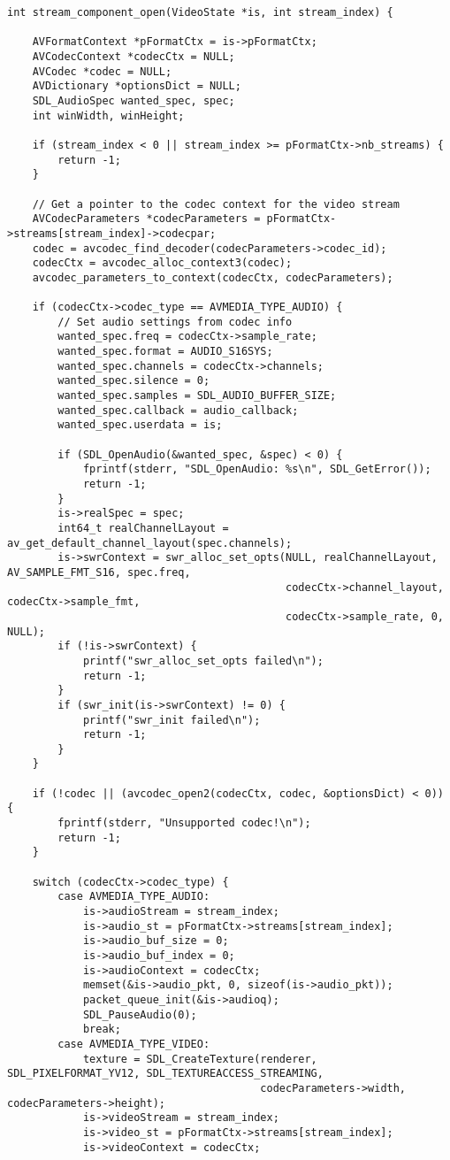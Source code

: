 \begin{lstlisting}
int stream_component_open(VideoState *is, int stream_index) {

    AVFormatContext *pFormatCtx = is->pFormatCtx;
    AVCodecContext *codecCtx = NULL;
    AVCodec *codec = NULL;
    AVDictionary *optionsDict = NULL;
    SDL_AudioSpec wanted_spec, spec;
    int winWidth, winHeight;

    if (stream_index < 0 || stream_index >= pFormatCtx->nb_streams) {
        return -1;
    }

    // Get a pointer to the codec context for the video stream
    AVCodecParameters *codecParameters = pFormatCtx->streams[stream_index]->codecpar;
    codec = avcodec_find_decoder(codecParameters->codec_id);
    codecCtx = avcodec_alloc_context3(codec);
    avcodec_parameters_to_context(codecCtx, codecParameters);

    if (codecCtx->codec_type == AVMEDIA_TYPE_AUDIO) {
        // Set audio settings from codec info
        wanted_spec.freq = codecCtx->sample_rate;
        wanted_spec.format = AUDIO_S16SYS;
        wanted_spec.channels = codecCtx->channels;
        wanted_spec.silence = 0;
        wanted_spec.samples = SDL_AUDIO_BUFFER_SIZE;
        wanted_spec.callback = audio_callback;
        wanted_spec.userdata = is;

        if (SDL_OpenAudio(&wanted_spec, &spec) < 0) {
            fprintf(stderr, "SDL_OpenAudio: %s\n", SDL_GetError());
            return -1;
        }
        is->realSpec = spec;
        int64_t realChannelLayout = av_get_default_channel_layout(spec.channels);
        is->swrContext = swr_alloc_set_opts(NULL, realChannelLayout, AV_SAMPLE_FMT_S16, spec.freq,
                                            codecCtx->channel_layout, codecCtx->sample_fmt,
                                            codecCtx->sample_rate, 0, NULL);
        if (!is->swrContext) {
            printf("swr_alloc_set_opts failed\n");
            return -1;
        }
        if (swr_init(is->swrContext) != 0) {
            printf("swr_init failed\n");
            return -1;
        }
    }

    if (!codec || (avcodec_open2(codecCtx, codec, &optionsDict) < 0)) {
        fprintf(stderr, "Unsupported codec!\n");
        return -1;
    }

    switch (codecCtx->codec_type) {
        case AVMEDIA_TYPE_AUDIO:
            is->audioStream = stream_index;
            is->audio_st = pFormatCtx->streams[stream_index];
            is->audio_buf_size = 0;
            is->audio_buf_index = 0;
            is->audioContext = codecCtx;
            memset(&is->audio_pkt, 0, sizeof(is->audio_pkt));
            packet_queue_init(&is->audioq);
            SDL_PauseAudio(0);
            break;
        case AVMEDIA_TYPE_VIDEO:
            texture = SDL_CreateTexture(renderer, SDL_PIXELFORMAT_YV12, SDL_TEXTUREACCESS_STREAMING,
                                        codecParameters->width, codecParameters->height);
            is->videoStream = stream_index;
            is->video_st = pFormatCtx->streams[stream_index];
            is->videoContext = codecCtx;


\end{lstlisting}
